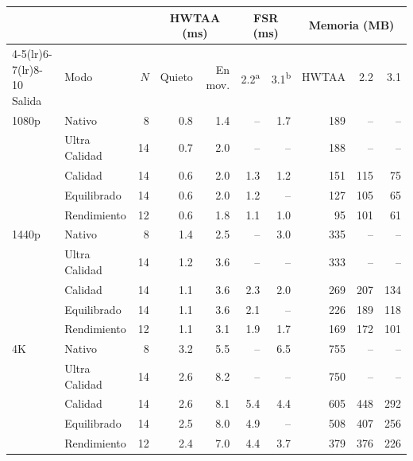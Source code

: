 \begin{tabular}{llrrrrrrrr}
\toprule
 & & & \multicolumn{2}{c}{HWTAA (ms)} & \multicolumn{2}{c}{FSR (ms)} & \multicolumn{3}{c}{Memoria (MB)} \\
\cmidrule(lr){4-5}\cmidrule(lr){6-7}\cmidrule(lr){8-10}
Salida & Modo & $N$ & Quieto & En mov. & 2.2\textsuperscript{a} & 3.1\textsuperscript{b} & HWTAA & 2.2 & 3.1 \\
\midrule
1080p & Nativo & 8 & 0.8 & 1.4 & -- & 1.7 & 189 & -- & -- \\
 & Ultra Calidad & 14 & 0.7 & 2.0 & -- & -- & 188 & -- & -- \\
 & Calidad & 14 & 0.6 & 2.0 & 1.3 & 1.2 & 151 & 115 & 75 \\
 & Equilibrado & 14 & 0.6 & 2.0 & 1.2 & -- & 127 & 105 & 65 \\
 & Rendimiento & 12 & 0.6 & 1.8 & 1.1 & 1.0 & 95 & 101 & 61 \\
\midrule
1440p & Nativo & 8 & 1.4 & 2.5 & -- & 3.0 & 335 & -- & -- \\
 & Ultra Calidad & 14 & 1.2 & 3.6 & -- & -- & 333 & -- & -- \\
 & Calidad & 14 & 1.1 & 3.6 & 2.3 & 2.0 & 269 & 207 & 134 \\
 & Equilibrado & 14 & 1.1 & 3.6 & 2.1 & -- & 226 & 189 & 118 \\
 & Rendimiento & 12 & 1.1 & 3.1 & 1.9 & 1.7 & 169 & 172 & 101 \\
\midrule
4K & Nativo & 8 & 3.2 & 5.5 & -- & 6.5 & 755 & -- & -- \\
 & Ultra Calidad & 14 & 2.6 & 8.2 & -- & -- & 750 & -- & -- \\
 & Calidad & 14 & 2.6 & 8.1 & 5.4 & 4.4 & 605 & 448 & 292 \\
 & Equilibrado & 14 & 2.5 & 8.0 & 4.9 & -- & 508 & 407 & 256 \\
 & Rendimiento & 12 & 2.4 & 7.0 & 4.4 & 3.7 & 379 & 376 & 226 \\
\bottomrule
\end{tabular}
